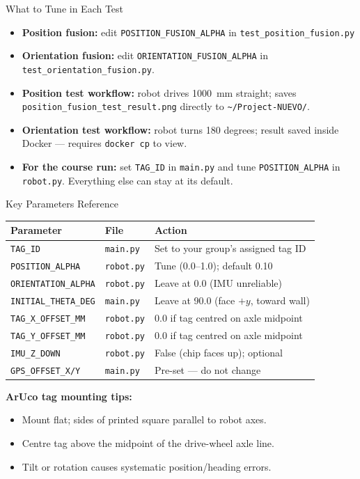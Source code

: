 \documentclass{beamer}
\begin{document}
\begin{frame}{What to Tune in Each Test}
    \begin{itemize}
        \item \textbf{Position fusion:} edit \texttt{POSITION\_FUSION\_ALPHA} in \texttt{test\_position\_fusion.py}
        \item \textbf{Orientation fusion:} edit \texttt{ORIENTATION\_FUSION\_ALPHA} in \texttt{test\_orientation\_fusion.py}. 
        \item \textbf{Position test workflow:} robot drives 1000~mm straight; saves \texttt{position\_fusion\_test\_result.png} directly to \texttt{\textasciitilde/Project-NUEVO/}.
        \item \textbf{Orientation test workflow:} robot turns 180 degrees; result saved inside Docker --- requires \texttt{docker cp} to view.
        \item \textbf{For the course run:} set \texttt{TAG\_ID} in \texttt{main.py} and tune \texttt{POSITION\_ALPHA} in \texttt{robot.py}.  Everything else can stay at its default.
    \end{itemize}
\end{frame}

\begin{frame}{Key Parameters Reference}
    \begin{tabular}{lll}
        \hline
        \textbf{Parameter} & \textbf{File} & \textbf{Action} \\
        \hline
        \texttt{TAG\_ID} & \texttt{main.py} & Set to your group's assigned tag ID \\
        \texttt{POSITION\_ALPHA} & \texttt{robot.py} & Tune (0.0--1.0); default 0.10 \\
        \texttt{ORIENTATION\_ALPHA} & \texttt{robot.py} & Leave at 0.0 (IMU unreliable) \\
        \texttt{INITIAL\_THETA\_DEG} & \texttt{main.py} & Leave at 90.0 (face $+y$, toward wall) \\
        \texttt{TAG\_X\_OFFSET\_MM} & \texttt{robot.py} & 0.0 if tag centred on axle midpoint \\
        \texttt{TAG\_Y\_OFFSET\_MM} & \texttt{robot.py} & 0.0 if tag centred on axle midpoint \\
        \texttt{IMU\_Z\_DOWN} & \texttt{robot.py} & False (chip faces up); optional \\
        \texttt{GPS\_OFFSET\_X/Y} & \texttt{main.py} & Pre-set --- do not change \\
        \hline
    \end{tabular}

    \vspace{0.4cm}
    \textbf{ArUco tag mounting tips:}
    \begin{itemize}
        \item Mount flat; sides of printed square parallel to robot axes.
        \item Centre tag above the midpoint of the drive-wheel axle line.
        \item Tilt or rotation causes systematic position/heading errors.
    \end{itemize}
\end{frame}
\end{document}
